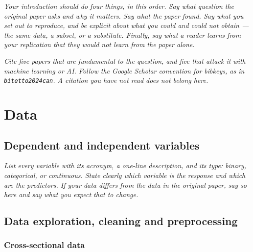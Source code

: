 \documentclass[12pt]{article}
\newcommand{\inst}[1]{\textit{#1}}
\begin{document}
\inst{Your introduction should do four things, in this order. Say what question
the original paper asks and why it matters. Say what the paper found. Say what
you set out to reproduce, and be explicit about what you could and could not
obtain --- the same data, a subset, or a substitute. Finally, say what a reader
learns from your replication that they would not learn from the paper alone.}

\inst{Cite five papers that are fundamental to the question, and five that
attack it with machine learning or AI. Follow the Google Scholar convention for
bibkeys, as in \texttt{bitetto2024can}. A citation you have not read does not
belong here.}


\section{Data}

\subsection{Dependent and independent variables}

\inst{List every variable with its acronym, a one-line description, and its type: binary, categorical, or continuous. State clearly which variable is the response
and which are the predictors. If your data differs from the data in the original paper, say so here and say what you expect that to change.}


\subsection{Data exploration, cleaning and preprocessing}

\subsubsection{Cross-sectional data}
\end{document}
